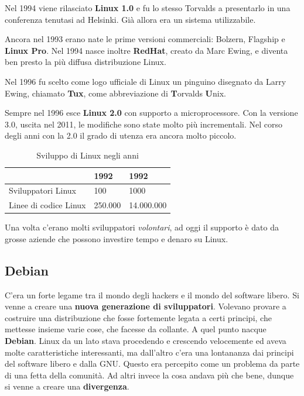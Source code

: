 Nel 1994 viene rilasciato \textbf{Linux 1.0} e fu lo stesso Torvalds a presentarlo in una conferenza tenutasi ad Helsinki. Già allora era un sistema utilizzabile.

Ancora nel 1993 erano nate le prime versioni commerciali: Bolzern, Flagship e \textbf{Linux Pro}. Nel 1994 nasce inoltre \textbf{RedHat}, creato da Marc Ewing, e diventa ben presto la più diffusa distribuzione Linux.

Nel 1996 fu scelto come logo ufficiale di Linux un pinguino disegnato da Larry Ewing, chiamato \textbf{Tux}, come abbreviazione di \textbf{T}orvalds \textbf{U}nix.

Sempre nel 1996 esce \textbf{Linux 2.0} con supporto a microprocessore. Con la versione 3.0, uscita nel 2011, le modifiche sono state molto più incrementali. Nel corso degli anni con la 2.0 il grado di utenza era ancora molto piccolo.

\begin{table}[htpd]
\centering
	\begin{tabular}[c]{l | l | l}
	\hline
	& 1992 & 1992 \\
	\hline
	Sviluppatori Linux & 100 & 1000 \\
	\hline
	Linee di codice Linux & 250.000 & 14.000.000 \\
	\hline
	\end{tabular}
\caption{Sviluppo di Linux negli anni}
\end{table}

Una volta c'erano molti sviluppatori \textit{volontari}, ad oggi il supporto è dato da grosse aziende che possono investire tempo e denaro su Linux.

\subsection{Debian}

C'era un forte legame tra il mondo degli hackers e il mondo del software libero. Si venne a creare una \textbf{nuova generazione di sviluppatori}. Volevano provare a costruire una distribuzione che fosse fortemente legata a certi principi, che mettesse insieme varie cose, che facesse da collante. A quel punto nacque \textbf{Debian}. Linux da un lato stava procedendo e crescendo velocemente ed aveva molte caratteristiche interessanti, ma dall'altro c'era una lontananza dai principi del software libero e dalla GNU. Questo era percepito come un problema da parte di una fetta della comunità. Ad altri invece la cosa andava più che bene, dunque si venne a creare una \textbf{divergenza}. 

